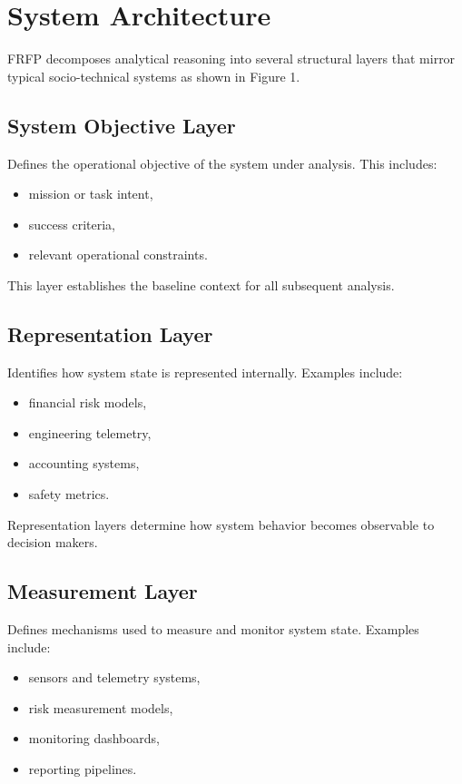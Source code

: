 \section{System Architecture}

FRFP decomposes analytical reasoning into several structural layers that mirror typical socio-technical systems as shown in Figure 1.

\subsection{System Objective Layer}

Defines the operational objective of the system under analysis. This includes:

\begin{itemize}
\item mission or task intent,
\item success criteria,
\item relevant operational constraints.
\end{itemize}

This layer establishes the baseline context for all subsequent analysis.

\subsection{Representation Layer}

Identifies how system state is represented internally. Examples include:

\begin{itemize}
\item financial risk models,
\item engineering telemetry,
\item accounting systems,
\item safety metrics.
\end{itemize}

Representation layers determine how system behavior becomes observable to decision makers.

\subsection{Measurement Layer}

Defines mechanisms used to measure and monitor system state. Examples include:

\begin{itemize}
\item sensors and telemetry systems,
\item risk measurement models,
\item monitoring dashboards,
\item reporting pipelines.
\end{itemize}

